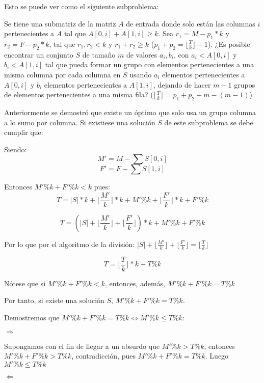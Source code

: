 \documentclass[article]{llncs}
\begin{document}
Esto se puede ver como el siguiente subproblema:

Se tiene una submatriz de la matriz $A$ de entrada donde solo est\'an 
las columnas $i$ pertenecientes a $A$ tal que $A[0, i] + A[1, i] \geq k$.
Sea $r_1 = M - p_1*k$ y $r_2 = F - p_2*k$, tal que $r_1, r_2 < k$ y 
$r_1 + r_2 \geq k$ ($p_1 + p_2 = \lfloor\frac{T}{k}\rfloor - 1$). ¿Es posible encontrar un conjunto $S$ de tamaño $m$ de valores $a_i, b_i$, con $a_i<A[0,i]$ y $b_i<A[1,i]$ tal que pueda formar un grupo con elementos pertenecientes a 
una misma columna por cada columna en $S$ usando $a_i$ elementos pertenecientes a $A[0,i]$ y $b_i$ elementos pertenecientes a $A[1,i]$, dejando de hacer $m-1$ grupos 
de elementos pertenecientes a una misma fila? ($\lfloor\frac{T}{k}\rfloor = p_1 + p_2 + m - (m-1)$)

Anteriormente se demostr\'o que existe un \'optimo que solo usa un grupo columna a lo sumo 
por columna. Si existiese una solución $S$ de este subproblema se debe cumplir que:


Siendo:
$$M' = M - \sum S[0,i]$$
$$F' = F - \sum S[1, i]$$

Entonces $M' \% k + F' \% k < k$ pues: 
$$T = |S| * k + \lfloor\frac{M'}{k}\rfloor*k + M'\%k + \lfloor\frac{F'}{k}\rfloor*k + F' \% k$$

$$T = (|S| + \lfloor\frac{M'}{k}\rfloor + \lfloor\frac{F'}{k}\rfloor)*k + M'\%k + F'\%k$$

Por lo que por el algoritmo de la división: $|S| + \lfloor\frac{M'}{k}\rfloor + \lfloor\frac{F'}{k}\rfloor = \lfloor\frac{T}{k}\rfloor$

$$T = \lfloor\frac{T}{k}\rfloor*k + T \% k$$

Nótese que si $M' \% k + F' \% k < k$, entonces, además, $M' \% k + F' \% k = T \% k$

Por tanto, si existe una solución $S$, $M' \% k + F' \% k = T \% k$.

Demostremos que $M' \% k + F' \% k = T \% k \Leftrightarrow M' \% k \leq T \% k$:

$\Rightarrow$

Supongamos con el fin de llegar a un absurdo que $M' \% k > T\%k$,
entonces $M'\%k + F'\%k > T\%k$, contradicci\'on, pues 
$M' \% k + F' \% k = T \% k$. Luego $M' \% k \leq T \% k$

$\Leftarrow$
\end{document}
